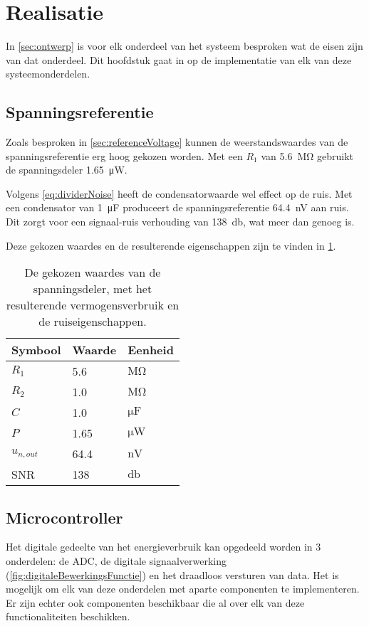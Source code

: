 \section{Realisatie}
In \cref{sec:ontwerp} is voor elk onderdeel van het systeem besproken wat de eisen zijn van dat onderdeel. Dit hoofdstuk gaat in op de implementatie van elk van deze systeemonderdelen.

\subsection{Spanningsreferentie}
Zoals besproken in \cref{sec:referenceVoltage} kunnen de weerstandswaardes van de spanningsreferentie erg hoog gekozen worden. Met een $R_1$ van \qty{5.6}{\mega\ohm} gebruikt de spanningsdeler \qty{1.65}{\micro\watt}.

Volgens \cref{eq:dividerNoise} heeft de condensatorwaarde wel effect op de ruis. Met een condensator van \qty{1}{\micro\farad} produceert de spanningsreferentie \qty{64.4}{\nano\volt} aan ruis. Dit zorgt voor een signaal-ruis verhouding van \qty{138}{\decibel}, wat meer dan genoeg is.

Deze gekozen waardes en de resulterende eigenschappen zijn te vinden in \cref{tab:divider}.

\begin{table}[ht]
\centering
\begin{tabular}{l|l|l}
    Symbool & Waarde & Eenheid \\
    \hline
    $R_1$       & 5.6  & $\si{\mega\ohm}$   \\
    $R_2$       & 1.0  & $\si{\mega\ohm}$   \\
    $C$         & 1.0  & $\si{\micro\farad}$\\
    $P$         & 1.65 & $\si{\micro\watt}$ \\
    $u_{n,out}$ & 64.4 & $\si{\nano\volt}$  \\
    SNR         & 138  & $\si{\decibel}$
\end{tabular}
\caption{De gekozen waardes van de spanningsdeler, met het resulterende vermogensverbruik en de ruiseigenschappen.}
\label{tab:divider}
\end{table}


\subsection{Microcontroller}
Het digitale gedeelte van het energieverbruik kan opgedeeld worden in 3 onderdelen: de ADC, de digitale signaalverwerking (\cref{fig:digitaleBewerkingsFunctie}) en het draadloos versturen van data. Het is mogelijk om elk van deze onderdelen met aparte componenten te implementeren. Er zijn echter ook componenten beschikbaar die al over elk van deze functionaliteiten beschikken.

